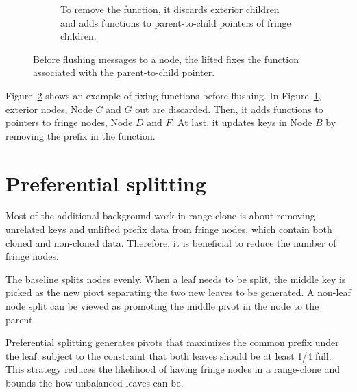 \begin{figure}
\begin{subfigure}{\textwidth}
        \caption{\label{subfig:xf-2} To remove the \xf function, it discards
            exterior children and adds \xf functions to parent-to-child pointers
            of fringe children.}
    \end{subfigure}
    \caption[Fix a \xf function during flushing]{\label{fig:xf}
        Before flushing messages to a node, the lifted \bedag fixes the \xf
        function associated with the parent-to-child pointer.}
\end{figure}

Figure~\ref{fig:xf} shows an example of fixing \xf functions before flushing.
In Figure~\ref{subfig:xf-2}, exterior nodes, Node $C$ and $G$ out are discarded.
Then, it adds \xf functions to pointers to fringe nodes, Node $D$ and $F$.
At last, it updates keys in Node $B$ by removing the prefix in the \xf function.

\section{Preferential splitting}

Most of the additional background work in range-clone is about removing
unrelated keys and unlifted prefix data from fringe nodes, which
contain both cloned and non-cloned data.
Therefore, it is beneficial to reduce the number of fringe nodes.

The baseline \bet splits nodes evenly.
When a leaf needs to be split, the middle key is picked as the new piovt
separating the two new leaves to be generated.
A non-leaf node split can be viewed as promoting the middle pivot in the node to
the parent.

Preferential splitting generates pivots that maximizes the common prefix under
the leaf, subject to the constraint that both leaves should be at least 1/4
full.
This strategy reduces the likelihood of having fringe nodes
in a range-clone and bounds the how unbalanced leaves can be.

